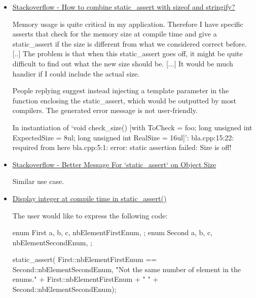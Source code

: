 \documentclass{wg21}
\begin{document}
\begin{itemize}
\item \href{https://stackoverflow.com/questions/11526526/how-to-combine-static-assert-with-sizeof-and-stringify}{Stackoverflow - How to combine static_assert with sizeof and stringify?}
\begin{quoteblock}
Memory usage is quite critical in my application. Therefore I have specific asserts that check for the memory size at compile time and give a static_assert if the size is different from what we considered correct before. [..] The problem is that when this static_assert goes off, it might be quite difficult to find out what the new size should be. [...] It would be much handier if I could include the actual size.
\end{quoteblock}

People replying suggest instead injecting a template parameter in the function enclosing the static_assert, which would be outputted by most compilers. The generated error message is not user-friendly.

\begin{quoteblock}
\begin{colorblock}
In instantiation of ‘void check_size() [with ToCheck = foo; long unsigned int ExpectedSize = 8ul; long unsigned int RealSize = 16ul]’:
bla.cpp:15:22:   required from here
bla.cpp:5:1: error: static assertion failed: Size is off!
\end{colorblock}
\end{quoteblock}

\item \href{https://stackoverflow.com/questions/11526526/how-to-combine-static-assert-with-sizeof-and-stringify}{Stackoverflow - Better Message For `static_assert` on Object Size}

Similar use case.

\item \href{https://stackoverflow.com/questions/13837668/display-integer-at-compile-time-in-static-assert}{Display integer at compile time in static_assert()}

The user would like to express the following code:

\begin{quoteblock}
\begin{colorblock}
enum First
{
    a,
    b,
    c,
    nbElementFirstEnum,
};
enum Second
{
    a,
    b,
    c,
    nbElementSecondEnum,
};

static_assert(
First::nbElementFirstEnum == Second::nbElementSecondEnum,
"Not the same number of element in the enums." + First::nbElementFirstEnum + " " + Second::nbElementSecondEnum);
\end{colorblock}
\end{quoteblock}


\end{itemize}
\end{document}
